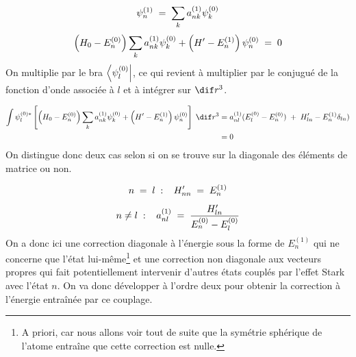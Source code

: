 \[
    \psi_n^{(1)} \; = \; \sum_k a_{nk}^{(1)} \psi_k^{(0)}
\]
\[
    \left(H_0 - E^{(0)}_n\right)\sum_k a_{nk}^{(1)} \psi_k^{(0)} + \left(H' - E^{(1)}_n\right)\psi_n^{(0)} \; = \; 0
\]
On multiplie par le bra $\bra{\psi^{(0)}_l}$, ce qui revient à multiplier par le conjugué de la fonction d'onde associée à $l$ et à intégrer sur $\dif r^3$.

\begin{align*}
    \int \psi^{(0)*}_l\left[ \left(H_0 - E^{(0)}_n\right)\sum_k a_{nk}^{(1)} \psi_k^{(0)} + \left(H' - E^{(1)}_n\right)\psi_n^{(0)}\right] \;\dif r^3 &= a^{(1)}_{nl}(E^{(0)}_l-E^{(0)}_n) \;+\; H'_{ln} - E^{(1)}_n\delta_{ln})\\
    &= 0
\end{align*}
On distingue donc deux cas selon si on se trouve sur la diagonale des éléments de matrice ou non.

\[
    n \; = \;  l\;:\;\;\; H'_{nn} \; = \; E^{(1)}_n
\]
\[
    n \neq l\;:\;\;\; a^{(1)}_{nl} \; = \; \dfrac{H'_{ln}}{E^{(0)}_n-E^{(0)}_l}
\]
On a donc ici une correction diagonale à l'énergie sous la forme de $E^{(1)}_n$ qui ne concerne que l'état lui-même\footnote{A priori, car nous allons voir tout de suite que la symétrie sphérique de l'atome entraîne que cette correction est nulle.} et une correction non diagonale aux vecteurs propres qui fait potentiellement intervenir d'autres états couplés par l'effet Stark avec l'état $n$. On va donc développer à l'ordre deux pour obtenir la correction à l'énergie entraînée par ce couplage.


